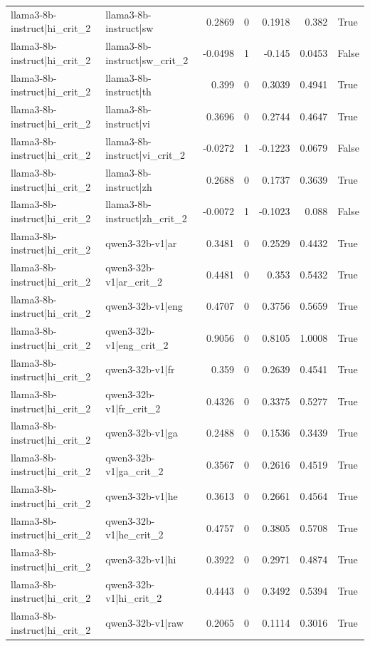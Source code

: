 \begin{table}
\begin{tabular}{l l r r r r l}
llama3-8b-instruct|hi_crit_2 & llama3-8b-instruct|sw & 0.2869 & 0 & 0.1918 & 0.382 & True \\
llama3-8b-instruct|hi_crit_2 & llama3-8b-instruct|sw_crit_2 & -0.0498 & 1 & -0.145 & 0.0453 & False \\
llama3-8b-instruct|hi_crit_2 & llama3-8b-instruct|th & 0.399 & 0 & 0.3039 & 0.4941 & True \\
llama3-8b-instruct|hi_crit_2 & llama3-8b-instruct|vi & 0.3696 & 0 & 0.2744 & 0.4647 & True \\
llama3-8b-instruct|hi_crit_2 & llama3-8b-instruct|vi_crit_2 & -0.0272 & 1 & -0.1223 & 0.0679 & False \\
llama3-8b-instruct|hi_crit_2 & llama3-8b-instruct|zh & 0.2688 & 0 & 0.1737 & 0.3639 & True \\
llama3-8b-instruct|hi_crit_2 & llama3-8b-instruct|zh_crit_2 & -0.0072 & 1 & -0.1023 & 0.088 & False \\
llama3-8b-instruct|hi_crit_2 & qwen3-32b-v1|ar & 0.3481 & 0 & 0.2529 & 0.4432 & True \\
llama3-8b-instruct|hi_crit_2 & qwen3-32b-v1|ar_crit_2 & 0.4481 & 0 & 0.353 & 0.5432 & True \\
llama3-8b-instruct|hi_crit_2 & qwen3-32b-v1|eng & 0.4707 & 0 & 0.3756 & 0.5659 & True \\
llama3-8b-instruct|hi_crit_2 & qwen3-32b-v1|eng_crit_2 & 0.9056 & 0 & 0.8105 & 1.0008 & True \\
llama3-8b-instruct|hi_crit_2 & qwen3-32b-v1|fr & 0.359 & 0 & 0.2639 & 0.4541 & True \\
llama3-8b-instruct|hi_crit_2 & qwen3-32b-v1|fr_crit_2 & 0.4326 & 0 & 0.3375 & 0.5277 & True \\
llama3-8b-instruct|hi_crit_2 & qwen3-32b-v1|ga & 0.2488 & 0 & 0.1536 & 0.3439 & True \\
llama3-8b-instruct|hi_crit_2 & qwen3-32b-v1|ga_crit_2 & 0.3567 & 0 & 0.2616 & 0.4519 & True \\
llama3-8b-instruct|hi_crit_2 & qwen3-32b-v1|he & 0.3613 & 0 & 0.2661 & 0.4564 & True \\
llama3-8b-instruct|hi_crit_2 & qwen3-32b-v1|he_crit_2 & 0.4757 & 0 & 0.3805 & 0.5708 & True \\
llama3-8b-instruct|hi_crit_2 & qwen3-32b-v1|hi & 0.3922 & 0 & 0.2971 & 0.4874 & True \\
llama3-8b-instruct|hi_crit_2 & qwen3-32b-v1|hi_crit_2 & 0.4443 & 0 & 0.3492 & 0.5394 & True \\
llama3-8b-instruct|hi_crit_2 & qwen3-32b-v1|raw & 0.2065 & 0 & 0.1114 & 0.3016 & True \\

\end{tabular}
\end{table}
